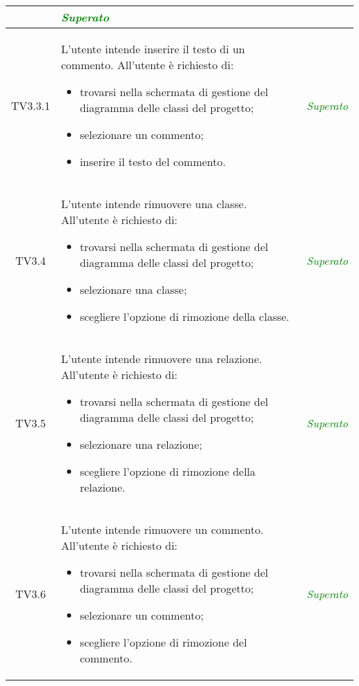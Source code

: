 \begin{longtable}{|c|>{}m{8cm}|c|}
\begin{itemize}
	
	
	
	
	
	
	
	
	
	
	
	
	
	
	
	
	
	
	
	
	
	
	
\end{itemize} & \textcolor{Green}{\textit{Superato}}\\ \hline
\hypertarget{TV3.3.1}{TV3.3.1} & L'utente intende inserire il testo di un commento. 
All'utente è richiesto di: 
\begin{itemize} 
	\item trovarsi nella schermata di gestione del diagramma delle classi del progetto;
	\item selezionare un commento;
	\item inserire il testo del commento.
\end{itemize} & \textcolor{Green}{\textit{Superato}}\\ \hline

\hypertarget{TV3.4}{TV3.4} & L'utente intende rimuovere una classe.
All'utente è richiesto di:
\begin{itemize}
	\item trovarsi nella schermata di gestione del diagramma delle classi del progetto;
	\item selezionare una classe;
	\item scegliere l'opzione di rimozione della classe.
\end{itemize} & \textcolor{Green}{\textit{Superato}}\\ \hline

\hypertarget{TV3.5}{TV3.5} & L'utente intende rimuovere una relazione.
All'utente è richiesto di:
\begin{itemize}
	\item trovarsi nella schermata di gestione del diagramma delle classi del progetto;
	\item selezionare una relazione; 
	\item scegliere l'opzione di rimozione della relazione.
\end{itemize} & \textcolor{Green}{\textit{Superato}}\\ \hline

\hypertarget{TV3.6}{TV3.6} & L'utente intende rimuovere un commento.
All'utente è richiesto di:
\begin{itemize}
	\item trovarsi nella schermata di gestione del diagramma delle classi del progetto;
	\item selezionare un commento;
	\item scegliere l'opzione di rimozione del commento.
\end{itemize} & \textcolor{Green}{\textit{Superato}}\\ \hline


\end{longtable}
